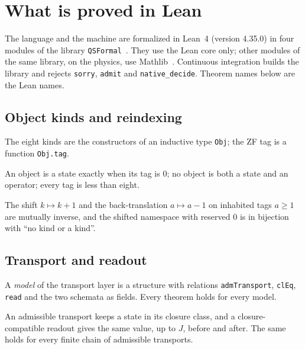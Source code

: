 \section{What is proved in Lean}\label{sec:lean}

The language and the machine are formalized in Lean~4 (version 4.35.0) in four modules of the library \texttt{QSFormal}~\cite{repo}.  They
use the Lean core only; other modules of the same library, on the physics, use Mathlib~\cite{mathlib}.  Continuous integration builds the
library and rejects \texttt{sorry}, \texttt{admit} and \texttt{native\_decide}.  Theorem names below are the Lean names.

\subsection{Object kinds and reindexing}

The eight kinds are the constructors of an inductive type \texttt{Obj}; the ZF tag is a function \texttt{Obj.tag}.

\begin{theorem}
An object is a state exactly when its tag is \(0\); no object is both a state and an operator; every tag is less than eight.
\end{theorem}

\begin{theorem}
The shift \(k\mapsto k+1\) and the back-translation \(a\mapsto a-1\) on inhabited tags \(a\ge1\) are mutually inverse, and the shifted namespace
with reserved \(0\) is in bijection with ``no kind or a kind''.
\end{theorem}

\subsection{Transport and readout}

A \emph{model} of the transport layer is a structure with relations \texttt{admTransport}, \texttt{clEq}, \texttt{read} and the two schemata as
fields.  Every theorem holds for every model.

\begin{theorem}
An admissible transport keeps a state in its closure class, and a closure-compatible readout gives the same value, up to \(J\), before and
after.  The same holds for every finite chain of admissible transports.
\end{theorem}

